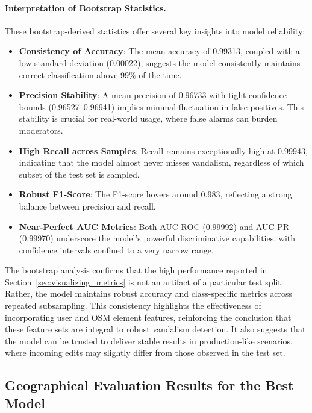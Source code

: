 \documentclass[
    13pt, %
    a4paper, %
    DIV14, %
    listof=totoc, %
    bibliography=totoc, %
    index=totoc, %
    headsepline
]{scrreprt}
\begin{document}
\paragraph{Interpretation of Bootstrap Statistics.}
These bootstrap-derived statistics offer several key insights into model reliability:

\begin{itemize}
    \item \textbf{Consistency of Accuracy}: The mean accuracy of 0.99313, coupled with a low standard deviation (0.00022), suggests the model consistently maintains correct classification above 99\% of the time.
    \item \textbf{Precision Stability}: A mean precision of 0.96733 with tight confidence bounds (0.96527--0.96941) implies minimal fluctuation in false positives. This stability is crucial for real-world usage, where false alarms can burden moderators.
    \item \textbf{High Recall across Samples}: Recall remains exceptionally high at 0.99943, indicating that the model almost never misses vandalism, regardless of which subset of the test set is sampled.
    \item \textbf{Robust F1-Score}: The F1-score hovers around 0.983, reflecting a strong balance between precision and recall.
    \item \textbf{Near-Perfect AUC Metrics}: Both AUC-ROC (0.99992) and AUC-PR (0.99970) underscore the model’s powerful discriminative capabilities, with confidence intervals confined to a very narrow range.
\end{itemize}

\noindent The bootstrap analysis confirms that the high performance reported in Section~\ref{sec:visualizing_metrics} is not an artifact of a particular test split. Rather, the model maintains robust accuracy and class-specific metrics across repeated subsampling. This consistency highlights the effectiveness of incorporating user and OSM element features, reinforcing the conclusion that these feature sets are integral to robust vandalism detection. It also suggests that the model can be trusted to deliver stable results in production-like scenarios, where incoming edits may slightly differ from those observed in the test set.

\subsection{Geographical Evaluation Results for the Best Model}
\label{sec:geo_eval_best_model}
\end{document}
